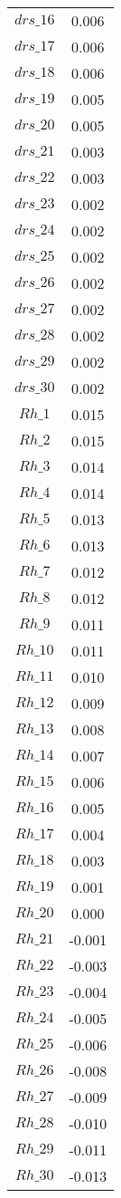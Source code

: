 \begin{center}
\begin{longtable}{cc}
$drs\_16$ 	 & 	 0.006 \\
$drs\_17$ 	 & 	 0.006 \\
$drs\_18$ 	 & 	 0.006 \\
$drs\_19$ 	 & 	 0.005 \\
$drs\_20$ 	 & 	 0.005 \\
$drs\_21$ 	 & 	 0.003 \\
$drs\_22$ 	 & 	 0.003 \\
$drs\_23$ 	 & 	 0.002 \\
$drs\_24$ 	 & 	 0.002 \\
$drs\_25$ 	 & 	 0.002 \\
$drs\_26$ 	 & 	 0.002 \\
$drs\_27$ 	 & 	 0.002 \\
$drs\_28$ 	 & 	 0.002 \\
$drs\_29$ 	 & 	 0.002 \\
$drs\_30$ 	 & 	 0.002 \\
$Rh\_1$ 	 & 	 0.015 \\
$Rh\_2$ 	 & 	 0.015 \\
$Rh\_3$ 	 & 	 0.014 \\
$Rh\_4$ 	 & 	 0.014 \\
$Rh\_5$ 	 & 	 0.013 \\
$Rh\_6$ 	 & 	 0.013 \\
$Rh\_7$ 	 & 	 0.012 \\
$Rh\_8$ 	 & 	 0.012 \\
$Rh\_9$ 	 & 	 0.011 \\
$Rh\_10$ 	 & 	 0.011 \\
$Rh\_11$ 	 & 	 0.010 \\
$Rh\_12$ 	 & 	 0.009 \\
$Rh\_13$ 	 & 	 0.008 \\
$Rh\_14$ 	 & 	 0.007 \\
$Rh\_15$ 	 & 	 0.006 \\
$Rh\_16$ 	 & 	 0.005 \\
$Rh\_17$ 	 & 	 0.004 \\
$Rh\_18$ 	 & 	 0.003 \\
$Rh\_19$ 	 & 	 0.001 \\
$Rh\_20$ 	 & 	 0.000 \\
$Rh\_21$ 	 & 	 -0.001 \\
$Rh\_22$ 	 & 	 -0.003 \\
$Rh\_23$ 	 & 	 -0.004 \\
$Rh\_24$ 	 & 	 -0.005 \\
$Rh\_25$ 	 & 	 -0.006 \\
$Rh\_26$ 	 & 	 -0.008 \\
$Rh\_27$ 	 & 	 -0.009 \\
$Rh\_28$ 	 & 	 -0.010 \\
$Rh\_29$ 	 & 	 -0.011 \\
$Rh\_30$ 	 & 	 -0.013 \\
\bottomrule%
\end{longtable}
\end{center}
